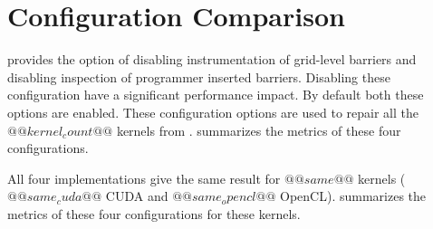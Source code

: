 \section{Configuration Comparison}

\tool provides the option of disabling instrumentation of grid-level barriers and disabling inspection of programmer inserted barriers. Disabling these configuration have a significant performance impact. By default both these options are enabled. These configuration options are used to repair all the $@@kernel_count@@$ kernels from .  summarizes the metrics of these four configurations.



All four implementations give the same result for $@@same@@$ kernels ($@@same_cuda@@$ CUDA and $@@same_opencl@@$ OpenCL).  summarizes the metrics of these four configurations for these kernels.


